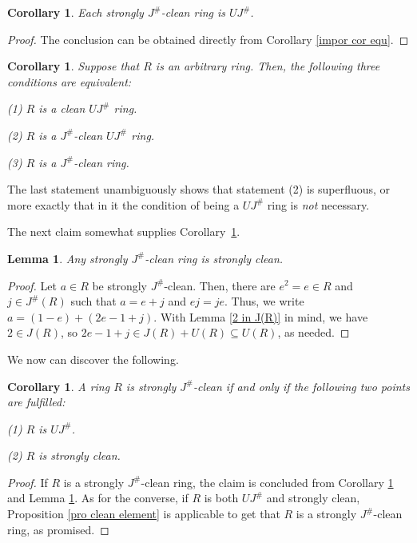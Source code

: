 \documentclass[12pt]{amsart}
\newtheorem{lemma}[theorem]{Lemma}
\newtheorem{corollary}[theorem]{Corollary}
\theoremstyle{definition}
\begin{document}
\begin{corollary}\label{cor1}
Each strongly $J^{\#}$-clean ring is $UJ^{\#}$.
\end{corollary}

\begin{proof}
The conclusion can be obtained directly from Corollary \ref{impor cor equ}.
\end{proof}

\begin{corollary}\label{1.6}
Suppose that $R$ is an arbitrary ring. Then, the following three conditions are equivalent:
	
(1) $R$ is a clean $UJ^{\#}$ ring.
	
(2) $R$ is a $J^{\#}$-clean $UJ^{\#}$ ring.
	
(3) $R$ is a $J^{\#}$-clean ring.
\end{corollary}

The last statement unambiguously shows that statement (2) is superfluous, or more exactly that in it the condition of being a $UJ^{\#}$ ring is {\it not} necessary.

\medskip

The next claim somewhat supplies Corollary~\ref{cor1}.

\begin{lemma}\label{cor2}
Any strongly $J^{\#}$-clean ring is strongly clean.
\end{lemma}

\begin{proof}
Let $a \in R$ be strongly $J^{\#}$-clean. Then, there are $e^2 = e \in R$ and $j \in J^{\#}(R)$ such that $a = e + j$ and $ej = je$. Thus, we write $a = (1 - e) + (2e - 1 + j)$. With Lemma \ref{2 in J(R)} in mind, we have $2 \in J(R)$, so $2e -1 + j \in J(R) + U(R) \subseteq U(R)$, as needed.
\end{proof}

We now can discover the following.

\begin{corollary}
A ring $R$ is strongly $J^{\#}$-clean if and only if the following two points are fulfilled:
	
(1) $R$ is $UJ^{\#}$.
	
(2) $R$ is strongly clean.
\end{corollary}

\begin{proof}
If $R$ is a strongly $J^{\#}$-clean ring, the claim is concluded from Corollary \ref{cor1} and Lemma \ref{cor2}. As for the converse, if $R$ is both $UJ^{\#}$ and strongly clean, Proposition \ref{pro clean element} is applicable to get that $R$ is a strongly $J^{\#}$-clean ring, as promised.
\end{proof}
\end{document}
